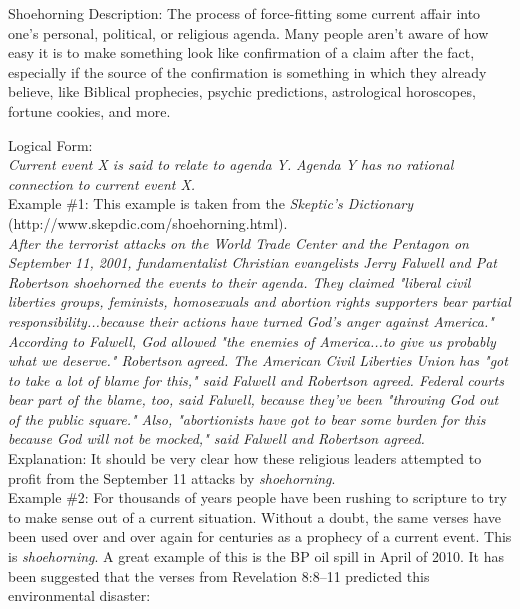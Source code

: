 \documentclass[a4paper,12pt,single,pdftex]{scrbook}
\begin{document}
Shoehorning
    Description: The process of force-fitting some current affair into one's personal, political, or religious agenda.  Many people aren't aware of how easy it is to make something look like confirmation of a claim after the fact, especially if the source of the confirmation is something in which they already believe, like Biblical prophecies, psychic predictions, astrological horoscopes, fortune cookies, and more.

    
      Logical Form:
    \\

    
      {\em Current event X is said to relate to agenda Y.} \newline
{\em Agenda Y has no rational connection to current event X.}
    \\

    
      Example \#1: This example is taken from the {\it Skeptic’s Dictionary} (http://www.skepdic.com/shoehorning.html). 
    \\

    
      {\em After the terrorist attacks on the World Trade Center and the Pentagon on September 11, 2001, fundamentalist Christian evangelists Jerry Falwell and Pat Robertson shoehorned the events to their agenda. They claimed "liberal civil liberties groups, feminists, homosexuals and abortion rights supporters bear partial responsibility...because their actions have turned God's anger against America." According to Falwell, God allowed "the enemies of America...to give us probably what we deserve." Robertson agreed. The American Civil Liberties Union has "got to take a lot of blame for this," said Falwell and Robertson agreed. Federal courts bear part of the blame, too, said Falwell, because they've been "throwing God out of the public square." Also, "abortionists have got to bear some burden for this because God will not be mocked," said Falwell and Robertson agreed.}
    \\

    
      Explanation: It should be very clear how these religious leaders attempted to profit from the September 11 attacks by {\it shoehorning}.
    \\

    
      Example \#2: For thousands of years people have been rushing to scripture to try to make sense out of a current situation.  Without a doubt, the same verses have been used over and over again for centuries as a prophecy of a current event.  This is {\it shoehorning}.  A great example of this is the BP oil spill in April of 2010.  It has been suggested that the verses from Revelation 8:8–11 predicted this environmental disaster:
    \\
\end{document}
